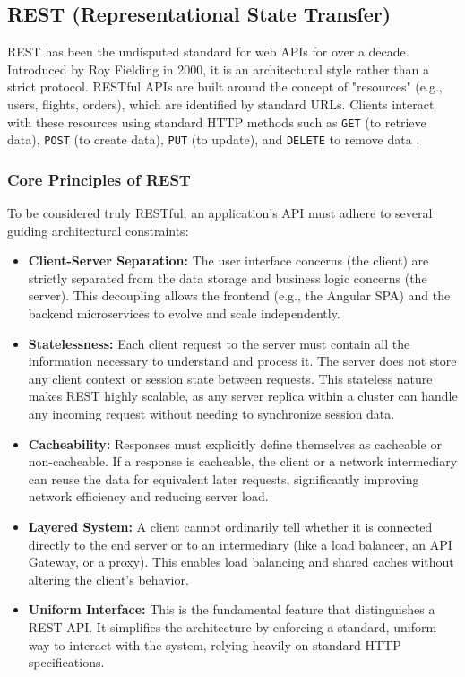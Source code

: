 \subsection{REST (Representational State Transfer)}

REST has been the undisputed standard for web APIs for over a decade. Introduced by Roy Fielding in 2000, it is an architectural style rather than a strict protocol. RESTful APIs are built around the concept of "resources" (e.g., users, flights, orders), which are identified by standard URLs. Clients interact with these resources using standard HTTP methods such as \texttt{GET} (to retrieve data), \texttt{POST} (to create data), \texttt{PUT} (to update), and \texttt{DELETE} to remove data \cite{aws_rest_api}.

\subsubsection{Core Principles of REST}

To be considered truly RESTful, an application's API must adhere to several guiding architectural constraints:
\begin{itemize}
    \item \textbf{Client-Server Separation:} The user interface concerns (the client) are strictly separated from the data storage and business logic concerns (the server). This decoupling allows the frontend (e.g., the Angular SPA) and the backend microservices to evolve and scale independently.
    \item \textbf{Statelessness:} Each client request to the server must contain all the information necessary to understand and process it. The server does not store any client context or session state between requests. This stateless nature makes REST highly scalable, as any server replica within a cluster can handle any incoming request without needing to synchronize session data.
    \item \textbf{Cacheability:} Responses must explicitly define themselves as cacheable or non-cacheable. If a response is cacheable, the client or a network intermediary can reuse the data for equivalent later requests, significantly improving network efficiency and reducing server load.
    \item \textbf{Layered System:} A client cannot ordinarily tell whether it is connected directly to the end server or to an intermediary (like a load balancer, an API Gateway, or a proxy). This enables load balancing and shared caches without altering the client's behavior.
    \item \textbf{Uniform Interface:} This is the fundamental feature that distinguishes a REST API. It simplifies the architecture by enforcing a standard, uniform way to interact with the system, relying heavily on standard HTTP specifications.
\end{itemize}

